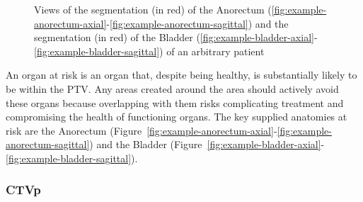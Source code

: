 \documentclass[12pt,twoside]{report}
\begin{document}
\begin{figure}[H]
{  }
  \caption{Views of the segmentation (in red) of the Anorectum (\ref{fig:example-anorectum-axial}-\ref{fig:example-anorectum-sagittal}) and  the segmentation (in red) of the Bladder (\ref{fig:example-bladder-axial}-\ref{fig:example-bladder-sagittal}) of an arbitrary patient}
\end{figure}

An organ at risk is an organ that, despite being healthy, is substantially likely to be within the PTV. Any areas created around the area should actively avoid these organs because overlapping with them risks complicating treatment and compromising the health of functioning organs. The key supplied anatomies at risk are the  Anorectum (Figure~\ref{fig:example-anorectum-axial}-\ref{fig:example-anorectum-sagittal}) and the Bladder (Figure~\ref{fig:example-bladder-axial}-\ref{fig:example-bladder-sagittal}).

\subsubsection{CTVp}\label{sec:data-CTVp}
\end{document}
